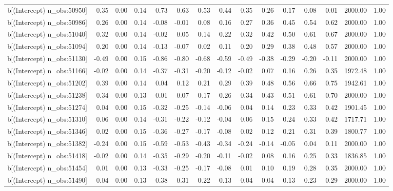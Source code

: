 \begin{table}[ht]
\begin{tabular}{rrrrrrrrrrrrrrr}
  b[(Intercept) n\_obs:50950] & -0.35 & 0.00 & 0.14 & -0.73 & -0.63 & -0.53 & -0.44 & -0.35 & -0.26 & -0.17 & -0.08 & 0.01 & 2000.00 & 1.00 \\ 
  b[(Intercept) n\_obs:50986] & 0.26 & 0.00 & 0.14 & -0.08 & -0.01 & 0.08 & 0.16 & 0.27 & 0.36 & 0.45 & 0.54 & 0.62 & 2000.00 & 1.00 \\ 
  b[(Intercept) n\_obs:51040] & 0.32 & 0.00 & 0.14 & -0.02 & 0.05 & 0.14 & 0.22 & 0.32 & 0.42 & 0.50 & 0.61 & 0.67 & 2000.00 & 1.00 \\ 
  b[(Intercept) n\_obs:51094] & 0.20 & 0.00 & 0.14 & -0.13 & -0.07 & 0.02 & 0.11 & 0.20 & 0.29 & 0.38 & 0.48 & 0.57 & 2000.00 & 1.00 \\ 
  b[(Intercept) n\_obs:51130] & -0.49 & 0.00 & 0.15 & -0.86 & -0.80 & -0.68 & -0.59 & -0.49 & -0.38 & -0.29 & -0.20 & -0.11 & 2000.00 & 1.00 \\ 
  b[(Intercept) n\_obs:51166] & -0.02 & 0.00 & 0.14 & -0.37 & -0.31 & -0.20 & -0.12 & -0.02 & 0.07 & 0.16 & 0.26 & 0.35 & 1972.48 & 1.00 \\ 
  b[(Intercept) n\_obs:51202] & 0.39 & 0.00 & 0.14 & 0.04 & 0.12 & 0.21 & 0.29 & 0.39 & 0.48 & 0.56 & 0.66 & 0.75 & 1942.61 & 1.00 \\ 
  b[(Intercept) n\_obs:51238] & 0.34 & 0.00 & 0.13 & 0.01 & 0.07 & 0.17 & 0.26 & 0.34 & 0.43 & 0.51 & 0.61 & 0.70 & 2000.00 & 1.00 \\ 
  b[(Intercept) n\_obs:51274] & 0.04 & 0.00 & 0.15 & -0.32 & -0.25 & -0.14 & -0.06 & 0.04 & 0.14 & 0.23 & 0.33 & 0.42 & 1901.45 & 1.00 \\ 
  b[(Intercept) n\_obs:51310] & 0.06 & 0.00 & 0.14 & -0.31 & -0.22 & -0.12 & -0.04 & 0.06 & 0.15 & 0.24 & 0.33 & 0.42 & 1717.71 & 1.00 \\ 
  b[(Intercept) n\_obs:51346] & 0.02 & 0.00 & 0.15 & -0.36 & -0.27 & -0.17 & -0.08 & 0.02 & 0.12 & 0.21 & 0.31 & 0.39 & 1800.77 & 1.00 \\ 
  b[(Intercept) n\_obs:51382] & -0.24 & 0.00 & 0.15 & -0.59 & -0.53 & -0.43 & -0.34 & -0.24 & -0.14 & -0.05 & 0.04 & 0.11 & 2000.00 & 1.00 \\ 
  b[(Intercept) n\_obs:51418] & -0.02 & 0.00 & 0.14 & -0.35 & -0.29 & -0.20 & -0.11 & -0.02 & 0.08 & 0.16 & 0.25 & 0.33 & 1836.85 & 1.00 \\ 
  b[(Intercept) n\_obs:51454] & 0.01 & 0.00 & 0.13 & -0.33 & -0.25 & -0.17 & -0.08 & 0.01 & 0.10 & 0.19 & 0.28 & 0.35 & 2000.00 & 1.00 \\ 
  b[(Intercept) n\_obs:51490] & -0.04 & 0.00 & 0.13 & -0.38 & -0.31 & -0.22 & -0.13 & -0.04 & 0.04 & 0.13 & 0.23 & 0.29 & 2000.00 & 1.00 \\ 

\end{tabular}
\end{table}
